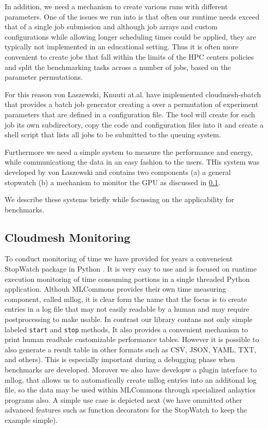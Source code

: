 \documentclass[utf8]{FrontiersinVancouver} %
\begin{document}
In addition, we need a mechanism to create various runs with different
parameters. One of the issues we run into is that often our runtime
needs exceed that of a single job submission and although job arrays
and custom configurations while allowing longer scheduling times could
be applied, they are typically not implemented in an educational
setting. Thus it is often more convenient to create jobs that fall
within the limits of the HPC centers policies and split the
benchmarking tasks across a number of jobs, based on the parameter
permutations.

For this reason von Laszewski, Knuuti at.al. have implemented
cloudmesh-sbatch that provides a batch job generator creating a over a
permutation of experiment parameters that are defined in a
configuration file. The tool will create for each job its own
subdirectory, copy the code and configuration files into it and create
a shell script that lists all jobs to be submitted to the queuing
system.

Furthermore we need a simple system to measure the performance and
energy, while communicationg the data in an easy fashion to the
users. THis system was developed by von Laszewski and contains two
components (a) a general stopwatch (b) a mechanism to monitor the GPU
as discussed in \ref{sec:monitoring}.

We describe these systems briefly while focussing on the applicability
for benchmarks.

\subsection{Cloudmesh Monitoring}
\label{sec:monitoring}

To conduct monitoring of time we have provided for years a conveneient
StopWatch package in Python \citep{cloudmesh-stopwatch}.  It is very
easy to use and is focused on runtime execution monitoring of time
consuming portions in a single threaded Python application. Althouh
MLCommons provides their own time measuring component, called mllog,
it is clear form the name that the focus is to create entries in a log
file that may not easily readable by a human and may require
postprocessing to make usable. In contrast our library contans not
only simple labeled \verb|start| and \verb|stop| methods, It also
provides a convenient mechanism to print human readbale customizable
performance tables. However it is possible to also generate a result
table in other formats such as CSV, JSON, YAML, TXT, and others).
This is especially important during a debugging phase when benchmarks
are developed. Morover we also have developw a plugin interface to
mllog, that allows us to automatically create mllog entries into an
additonal log file, so the data may be used within MLCommons through
specialized anlaytics programs also. A simple use case is depicted
next  (we have ommitted other advanced features such as function
decorators for the StopWatch to keep the example simple).
\end{document}
